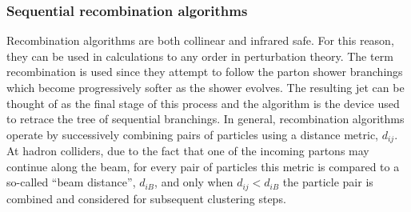 \subsubsection{Sequential recombination algorithms}

Recombination algorithms are both collinear and infrared safe. For this reason, they can be used in calculations to any order in perturbation theory. %
The term recombination is used since they attempt to follow the parton shower branchings which become progressively softer as the shower evolves. The resulting jet can be thought of as the final stage of this process and the algorithm is the device used to retrace the tree of sequential branchings.
In general, recombination algorithms operate by successively combining pairs of particles using a distance metric, $d_{ij}$.  At hadron colliders, due to the fact that one of the incoming partons may continue along the beam, for every pair of particles this metric is compared to a so-called ``beam distance'', $d_{iB}$, and only when  $d_{ij}<d_{iB}$ the particle pair is combined and considered for subsequent clustering steps. 


